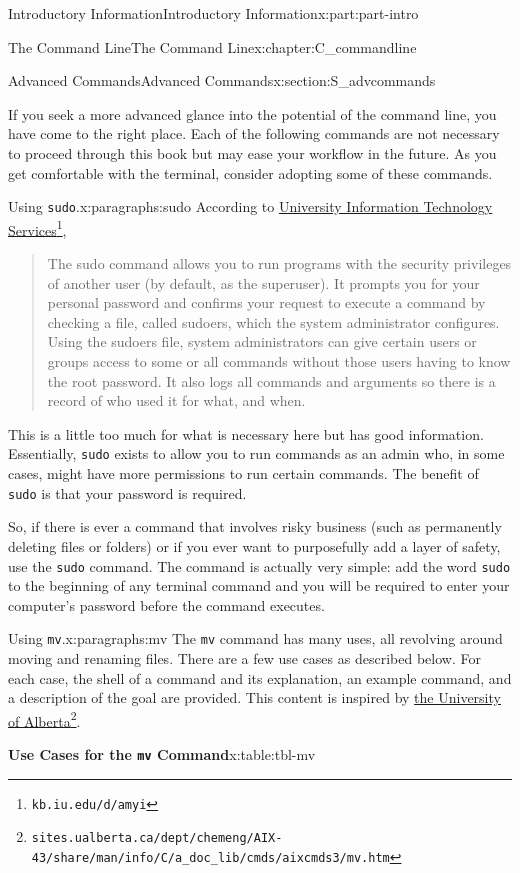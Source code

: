 \documentclass[oneside,10pt,]{book}
\newcommand{\mono}[1]{\texttt{#1}}
\begin{document}
\begin{partptx}{Introductory Information}{}{Introductory Information}{}{}{x:part:part-intro}
\begin{chapterptx}{The Command Line}{}{The Command Line}{}{}{x:chapter:C_commandline}
\begin{sectionptx}{Advanced Commands}{}{Advanced Commands}{}{}{x:section:S_advcommands}
\begin{introduction}{}
If you seek a more advanced glance into the potential of the command line, you have come to the right place. Each of the following commands are not necessary to proceed through this book but may ease your workflow in the future. As you get comfortable with the terminal, consider adopting some of these commands.%
\end{introduction}%
\begin{paragraphs}{Using \mono{sudo}.}{x:paragraphs:sudo}%
%
%
According to \href{https://kb.iu.edu/d/amyi}{University Information Technology Services}\footnote{\nolinkurl{kb.iu.edu/d/amyi}\label{g:fn:idp615623064}}, \begin{quote}%
The sudo command allows you to run programs with the security privileges of another user (by default, as the superuser). It prompts you for your personal password and confirms your request to execute a command by checking a file, called sudoers, which the system administrator configures. Using the sudoers file, system administrators can give certain users or groups access to some or all commands without those users having to know the root password. It also logs all commands and arguments so there is a record of who used it for what, and when.\end{quote}
%
\par
This is a little too much for what is necessary here but has good information. Essentially, \mono{sudo} exists to allow you to run commands as an admin who, in some cases, might have more permissions to run certain commands. The benefit of \mono{sudo} is that your password is required.%
\par
So, if there is ever a command that involves risky business (such as permanently deleting files or folders) or if you ever want to purposefully add a layer of safety, use the \mono{sudo} command. The command is actually very simple: add the word \mono{sudo} to the beginning of any terminal command and you will be required to enter your computer's password before the command executes.%
\end{paragraphs}%
\begin{paragraphs}{Using \mono{mv}.}{x:paragraphs:mv}%
%
%
%
%
The \mono{mv} command has many uses, all revolving around moving and renaming files. There are a few use cases as described below. For each case, the shell of a command and its explanation, an example command, and a description of the goal are provided. This content is inspired by \href{https://sites.ualberta.ca/dept/chemeng/AIX-43/share/man/info/C/a_doc_lib/cmds/aixcmds3/mv.htm}{the University of Alberta}\footnote{\nolinkurl{sites.ualberta.ca/dept/chemeng/AIX-43/share/man/info/C/a_doc_lib/cmds/aixcmds3/mv.htm}\label{g:fn:idp615633304}}. \begin{tableptx}{\textbf{Use Cases for the \mono{mv} Command}}{x:table:tbl-mv}{}%

\end{tableptx}
\end{paragraphs}
\end{sectionptx}
\end{chapterptx}
\end{partptx}
\end{document}
